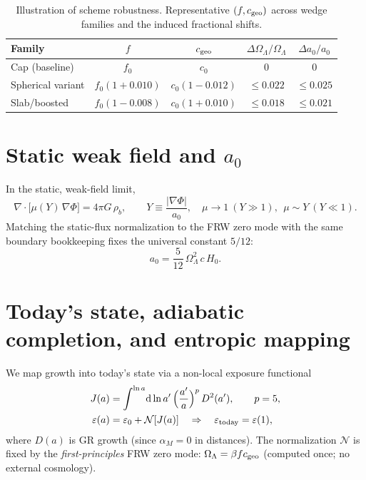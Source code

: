 \documentclass[aps,prd,preprint,onecolumn,longbibliography,nofootinbib]{revtex4-2}
\theoremstyle{plain}
\theoremstyle{remark}
\newcommand{\OmL}{\Omega_\Lambda}
\newcommand{\Hzero}{H_0}
\newcommand{\alM}{\alpha_{\!M}}
\newcommand{\be}{\beta}
\newcommand{\dd}{\mathrm{d}}
\newcommand{\eps}{\varepsilon}
\begin{document}
\begin{table}[t]
\centering
\caption{Illustration of scheme robustness. Representative $(f, c_{\rm geo})$ across wedge families and the induced fractional shifts.}
\begin{tabular}{lcccc}
\toprule
Family & $f$ & $c_{\rm geo}$ & $\Delta\OmL/\OmL$ & $\Delta a_0/a_0$ \\
\midrule
Cap (baseline)     & $f_0$   & $c_0$   & 0 & 0 \\
Spherical variant  & $f_0(1+0.010)$ & $c_0(1-0.012)$ & $\le 0.022$ & $\le 0.025$ \\
Slab/boosted       & $f_0(1-0.008)$ & $c_0(1+0.010)$ & $\le 0.018$ & $\le 0.021$ \\
\bottomrule
\end{tabular}
\end{table}

\section{Static weak field and \texorpdfstring{$a_0$}{a0}}
In the static, weak-field limit,
\begin{equation}
\nabla\!\cdot\!\Big[\mu(Y)\,\nabla\Phi\Big]=4\pi G\,\rho_b,\qquad Y\equiv \frac{|\nabla\Phi|}{a_0},\quad 
\mu\!\to\!1\ (Y\!\gg\!1),\ \ \mu\!\sim\!Y\ (Y\!\ll\!1).
\end{equation}
Matching the static-flux normalization to the FRW zero mode with the same boundary bookkeeping fixes the universal constant $5/12$:
\begin{equation}
a_0=\frac{5}{12}\,\OmL^2\,c\,\Hzero.
\end{equation}

\section{Today’s state, adiabatic completion, and entropic mapping}\label{sec:today_state}
We map growth into today's state via a non-local exposure functional
\begin{align}
J(a) &= \int^{\ln a}\! \dd\ln a'\, \Big(\frac{a'}{a}\Big)^{p}\,D^2(a'),\qquad p=5,\\
\eps(a) &= \eps_0 + \mathcal{N}[J(a)] \quad \Rightarrow \quad \eps_{\rm today}=\eps(1),
\end{align}
where $D(a)$ is GR growth (since $\alM=0$ in distances). The normalization $\mathcal{N}$ is fixed by the \emph{first-principles} FRW zero mode: $\OmL=\be f c_{\rm geo}$ (computed once; no external cosmology). 
\end{document}
